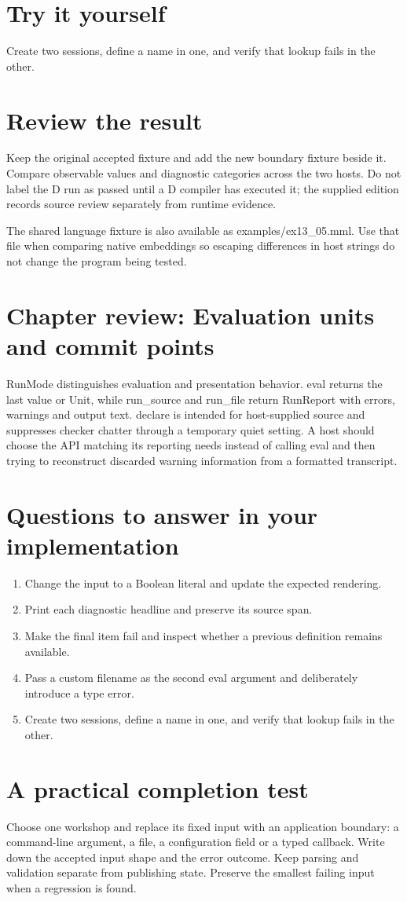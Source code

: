 \section*{Try it yourself}
Create two sessions, define a name in one, and verify that lookup fails in the other.

\section*{Review the result}
Keep the original accepted fixture and add the new boundary fixture beside it. Compare observable values and diagnostic categories across the two hosts. Do not label the D run as passed until a D compiler has executed it; the supplied edition records source review separately from runtime evidence.

The shared language fixture is also available as examples/ex13\_05.mml. Use that file when comparing native embeddings so escaping differences in host strings do not change the program being tested.

\clearpage
\section*{Chapter review: Evaluation units and commit points}
RunMode distinguishes evaluation and presentation behavior. eval returns the last value or Unit, while run\_source and run\_file return RunReport with errors, warnings and output text. declare is intended for host-supplied source and suppresses checker chatter through a temporary quiet setting. A host should choose the API matching its reporting needs instead of calling eval and then trying to reconstruct discarded warning information from a formatted transcript.

\section*{Questions to answer in your implementation}
\begin{enumerate}
\item Change the input to a Boolean literal and update the expected rendering.
\item Print each diagnostic headline and preserve its source span.
\item Make the final item fail and inspect whether a previous definition remains available.
\item Pass a custom filename as the second eval argument and deliberately introduce a type error.
\item Create two sessions, define a name in one, and verify that lookup fails in the other.
\end{enumerate}
\section*{A practical completion test}
Choose one workshop and replace its fixed input with an application boundary: a command-line argument, a file, a configuration field or a typed callback. Write down the accepted input shape and the error outcome. Keep parsing and validation separate from publishing state. Preserve the smallest failing input when a regression is found.

